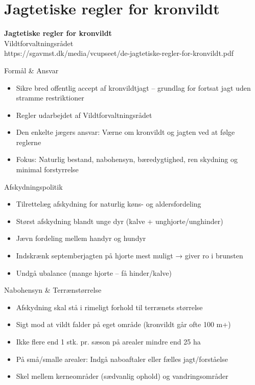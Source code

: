\section{Jagtetiske regler for kronvildt}

\begin{frame}
  \vspace{3em}
  \begin{center}
    {\LARGE \textbf{Jagtetiske regler for kronvildt}
    }
    \\
    \vspace{1em}
    Vildtforvaltningsrådet \\
    https://sgavmst.dk/media/vcupseet/de-jagtetiske-regler-for-kronvildt.pdf
  \end{center}
\end{frame}

\begin{frame}{Formål \& Ansvar}
\begin{itemize}
\item Sikre bred offentlig accept af kronvildtjagt – grundlag for fortsat jagt uden stramme restriktioner
\item Regler udarbejdet af Vildtforvaltningsrådet
\item Den enkelte jægers ansvar: Værne om kronvildt og jagten ved at følge reglerne
\item Fokus: Naturlig bestand, nabohensyn, bæredygtighed, ren skydning og minimal forstyrrelse
\end{itemize}
\end{frame}

\begin{frame}{Afskydningspolitik}
\begin{itemize}
\item Tilrettelæg afskydning for naturlig køns- og aldersfordeling
\item Størst afskydning blandt unge dyr (kalve + unghjorte/unghinder)
\item Jævn fordeling mellem handyr og hundyr
\item Indskrænk septemberjagten på hjorte mest muligt → giver ro i brunsten
\item Undgå ubalance (mange hjorte – få hinder/kalve)
\end{itemize}
\end{frame}

\begin{frame}{Nabohensyn \& Terrænstørrelse}
\begin{itemize}
\item Afskydning skal stå i rimeligt forhold til terrænets størrelse
\item Sigt mod at vildt falder på eget område (kronvildt går ofte 100 m+)
\item Ikke flere end 1 stk. pr. sæson på arealer mindre end 25 ha
\item På små/smalle arealer: Indgå naboaftaler eller fælles jagt/forståelse
\item Skel mellem kerneområder (sædvanlig ophold) og vandringsområder
\end{itemize}
\end{frame}

